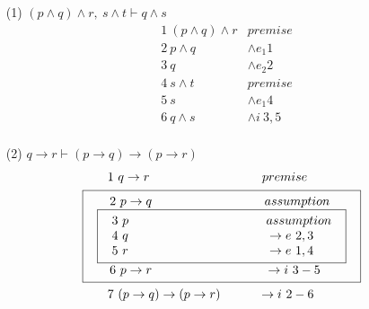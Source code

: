 \documentclass[a4paper,10pt]{article}
\begin{document}
\begin{enumerate}

	\item[(1)]	%
		$(p\land q)\land r,\ s\land t\vdash q\land s$ \\
	\begin{align*}
		&1\ (p\land q)\land r 	&premise \\
		&2\ p\land q 			&\land e_1 1 \\
		&3\ q 					&\land e_2 2 \\
		&4\ s\land t 			&premise \\
		&5\ s 					&\land e_1 4 \\
		&6\ q\land s 			&\land i\ 3,5 \\
	\end{align*}

	\item[(2)]	%
		$q\to r\vdash (p\to q)\to(p\to r)$ \\
	\begin{align*}
		&\quad\quad 1\ q\to r \quad\quad\quad\quad\quad\quad\quad\quad\quad premise \\
		&\fbox{
			$\begin{array}{l}
			\quad 2\ p\to q \quad\quad\quad\quad\quad\quad\quad\quad\quad assumption\\
	 			\fbox{
	 				$\begin{array}{l}
					3\ p \quad\quad\quad\quad\quad\quad\quad\quad\quad\quad\quad assumption\\
					4\ q \quad\quad\quad\quad\quad\quad\quad\quad\quad\quad\quad \to e\ 2,3 \\
					5\ r  \quad\quad\quad\quad\quad\quad\quad\quad\quad\quad\quad \to e\ 1,4 \\
		 			\end{array}$
				} \\
			\quad 6\ p\to r \quad\quad\quad\quad\quad\quad\quad\quad\quad \to i\ 3-5 \\
	 		\end{array}$
 		} \\
 		&\quad\quad 7\ (p\to q)\to(p\to r) \quad\quad\quad\to i\ 2-6 \\
	\end{align*}


\end{enumerate}
\end{document}

